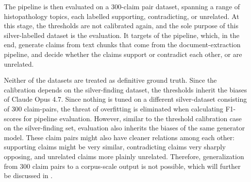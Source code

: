 The pipeline is then evaluated on a 300-claim pair dataset, spanning a range of histopathology topics, each labelled supporting, contradicting, or unrelated. At this stage, the thresholds are not calibrated again, and the sole purpose of this silver-labelled dataset is the evaluation. It targets  of the pipeline, which, in the end, generate claims from text chunks that come from the document-extraction pipeline, and decide whether the claims support or contradict each other, or are unrelated. 

Neither of the datasets are treated as definitive ground truth. Since the calibration depends on the silver-finding dataset, the thresholds inherit the biases of Claude Opus 4.7. Since nothing is tuned on a different silver-dataset consisting of 300 claim-pairs, the threat of overfitting is eliminated when calculating F1-scores for pipeline evaluation. However, similar to the threshold calibration case on the silver-finding set, evaluation also inherits the biases of the same generator model. These claim pairs might also have cleaner relations among each other: supporting claims might be very similar, contradicting claims very sharply opposing, and unrelated claims more plainly unrelated. Therefore, generalization from 300 claim pairs to a corpus-scale output is not possible, which will further be discussed in . 



